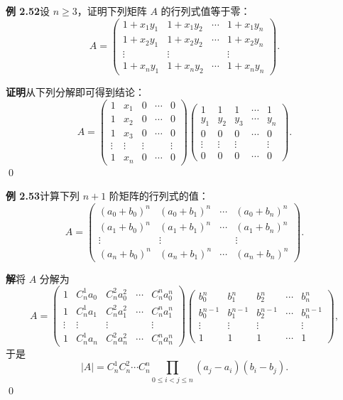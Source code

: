 \documentclass[UTF8, 12pt, fontset=fandol, oneside]{ctexart}
\begin{document}
\noindent\textbf{例 2.52}\quad 设 $n\ge3$，证明下列矩阵 $A$ 的行列式值等于零：
\[
A=
\left(
\begin{array}{cccc}
1+x_1y_1 & 1+x_1y_2 & \cdots & 1+x_1y_n\\
1+x_2y_1 & 1+x_2y_2 & \cdots & 1+x_2y_n\\
\vdots & \vdots & & \vdots\\
1+x_ny_1 & 1+x_ny_2 & \cdots & 1+x_ny_n
\end{array}
\right).
\]

\noindent\textbf{证明}\quad 从下列分解即可得到结论：
\[
A=
\left(
\begin{array}{ccccc}
1 & x_1 & 0 & \cdots & 0\\
1 & x_2 & 0 & \cdots & 0\\
1 & x_3 & 0 & \cdots & 0\\
\vdots & \vdots & \vdots & & \vdots\\
1 & x_n & 0 & \cdots & 0
\end{array}
\right)
\left(
\begin{array}{ccccc}
1 & 1 & 1 & \cdots & 1\\
y_1 & y_2 & y_3 & \cdots & y_n\\
0 & 0 & 0 & \cdots & 0\\
\vdots & \vdots & \vdots & & \vdots\\
0 & 0 & 0 & \cdots & 0
\end{array}
\right).
\]
\qed

\noindent\textbf{例 2.53}\quad 计算下列 $n+1$ 阶矩阵的行列式的值：
\[
A=
\left(
\begin{array}{cccc}
(a_0+b_0)^n & (a_0+b_1)^n & \cdots & (a_0+b_n)^n\\
(a_1+b_0)^n & (a_1+b_1)^n & \cdots & (a_1+b_n)^n\\
\vdots & \vdots & & \vdots\\
(a_n+b_0)^n & (a_n+b_1)^n & \cdots & (a_n+b_n)^n
\end{array}
\right).
\]

\noindent\textbf{解}\quad 将 $A$ 分解为
\[
A=
\left(
\begin{array}{ccccc}
1 & C_n^1a_0 & C_n^2a_0^2 & \cdots & C_n^na_0^n\\
1 & C_n^1a_1 & C_n^2a_1^2 & \cdots & C_n^na_1^n\\
\vdots & \vdots & \vdots & & \vdots\\
1 & C_n^1a_n & C_n^2a_n^2 & \cdots & C_n^na_n^n
\end{array}
\right)
\left(
\begin{array}{ccccc}
b_0^n & b_1^n & b_2^n & \cdots & b_n^n\\
b_0^{n-1} & b_1^{n-1} & b_2^{n-1} & \cdots & b_n^{n-1}\\
\vdots & \vdots & \vdots & & \vdots\\
1 & 1 & 1 & \cdots & 1
\end{array}
\right),
\]
于是
\[
|A|=C_n^1C_n^2\cdots C_n^n
\prod_{0\le i<j\le n}(a_j-a_i)(b_i-b_j).
\]
\qed
\end{document}
